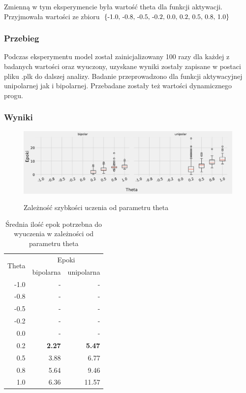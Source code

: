 \documentclass{article}
\begin{document}
Zmienną w tym eksperymencie była wartość theta dla funkcji aktywacji. Przyjmowała wartości ze zbioru \(\{$-1.0, -0.8, -0.5, -0.2, 0.0, 0.2, 0.5, 0.8, 1.0$\}\)
\subsubsection*{Przebieg}

Podczas eksperymentu model został zainicjalizowany 100 razy dla każdej z badanych wartości oraz wyuczony, uzyskane wyniki zostały zapisane w postaci pliku .plk do dalszej analizy. Badanie przeprowadzono dla funkcji aktywacyjnej unipolarnej jak i bipolarnej. Przebadane zostały też wartości dynamicznego progu.

\subsubsection*{Wyniki}
\begin{figure}[!h]
	\centering
	\caption{Zależność szybkości uczenia od parametru theta}
	\includegraphics[width=\textwidth]{per_theta.png}
	\label{fig:res11}
\end{figure}

\begin{table}[!h]
	\caption{Średnia ilość epok potrzebna do wyuczenia w zależności od parametru theta}
	\label{tabela-res-11}
	\centering
	\begin{tabular}{rrr}
		\toprule
		\multirow{2}{*}{Theta}   & \multicolumn{2}{c}{Epoki} \\
		     & bipolarna     & unipolarna    \\
		\midrule
		-1.0 & -             & -             \\
		-0.8 & -             & -             \\
		-0.5 & -             & -             \\
		-0.2 & -             & -             \\
		0.0  & -             & -             \\
		0.2  & \textbf{2.27} & \textbf{5.47} \\
		0.5  & 3.88          & 6.77          \\
		0.8  & 5.64          & 9.46          \\
		1.0  & 6.36          & 11.57         \\
		\bottomrule
	\end{tabular}
\end{table}
\end{document}
